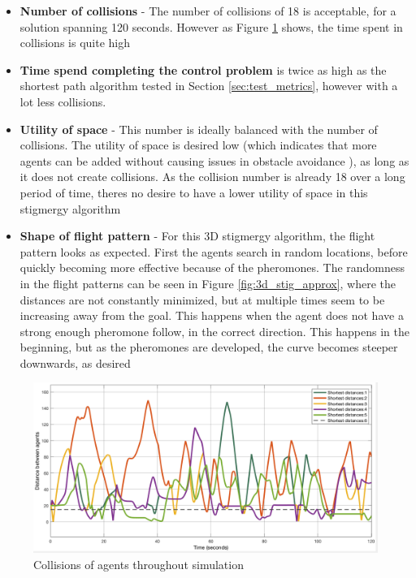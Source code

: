 \begin{itemize}
\item{\textbf{Number of collisions} - The number of collisions of 18 is acceptable, for a solution spanning 120 seconds. However as Figure \ref{fig:3d_stig_solved} shows, the time spent in collisions is quite high  }
\item{\textbf{Time spend completing the control problem} is twice as high as the shortest path algorithm tested in Section \ref{sec:test_metrics}, however with a lot less collisions.}
\item{\textbf{Utility of space} - This number is ideally balanced with the number of collisions. The utility of space is desired low (which indicates that more agents can be added without causing issues in obstacle avoidance ), as long as it does not create collisions. As the collision number is already 18 over a long period of time, theres no desire to have a lower utility of space in this stigmergy algorithm}
\item{\textbf{Shape of flight pattern} - For this 3D stigmergy algorithm, the flight pattern looks as expected. First the agents search in random locations, before quickly becoming more effective because of the pheromones. The randomness in the flight patterns can be seen in Figure \ref{fig:3d_stig_approx}, where the distances are not constantly minimized, but at multiple times seem to be increasing away from the goal. This happens when the agent does not have a strong enough pheromone follow, in the correct direction. This happens in the beginning, but as the pheromones are developed, the curve becomes steeper downwards, as desired}
\end{itemize}

\begin{figure}[H]
	\centering
	\includegraphics[width=1\columnwidth]{figures/STIG_overlap}
  	\caption{\label{fig:3d_stig_solved}Collisions of agents throughout simulation}
\end{figure}

